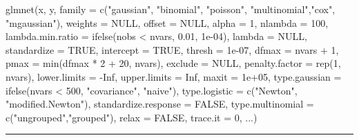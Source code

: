 \documentclass[
  letterpaper,
  DIV=11,
  numbers=noendperiod]{scrartcl}
\newenvironment{Shaded}{\begin{snugshade}}{\end{snugshade}}
\newcommand{\AttributeTok}[1]{\textcolor[rgb]{0.40,0.45,0.13}{#1}}
\newcommand{\ConstantTok}[1]{\textcolor[rgb]{0.56,0.35,0.01}{#1}}
\newcommand{\DecValTok}[1]{\textcolor[rgb]{0.68,0.00,0.00}{#1}}
\newcommand{\FloatTok}[1]{\textcolor[rgb]{0.68,0.00,0.00}{#1}}
\newcommand{\FunctionTok}[1]{\textcolor[rgb]{0.28,0.35,0.67}{#1}}
\newcommand{\NormalTok}[1]{\textcolor[rgb]{0.00,0.23,0.31}{#1}}
\newcommand{\SpecialCharTok}[1]{\textcolor[rgb]{0.37,0.37,0.37}{#1}}
\newcommand{\StringTok}[1]{\textcolor[rgb]{0.13,0.47,0.30}{#1}}
\begin{document}
\begin{Shaded}
\begin{Highlighting}[]
\FunctionTok{glmnet}\NormalTok{(x, y, }
 \AttributeTok{family =} \FunctionTok{c}\NormalTok{(}\StringTok{"gaussian"}\NormalTok{, }\StringTok{"binomial"}\NormalTok{, }\StringTok{"poisson"}\NormalTok{, }\StringTok{"multinomial"}\NormalTok{,}\StringTok{"cox"}\NormalTok{, }\StringTok{"mgaussian"}\NormalTok{),}
 \AttributeTok{weights =} \ConstantTok{NULL}\NormalTok{, }\AttributeTok{offset =} \ConstantTok{NULL}\NormalTok{, }\AttributeTok{alpha =} \DecValTok{1}\NormalTok{, }\AttributeTok{nlambda =} \DecValTok{100}\NormalTok{, }
 \AttributeTok{lambda.min.ratio =} \FunctionTok{ifelse}\NormalTok{(nobs }\SpecialCharTok{\textless{}}\NormalTok{ nvars, }\FloatTok{0.01}\NormalTok{, }\FloatTok{1e{-}04}\NormalTok{),}
 \AttributeTok{lambda =} \ConstantTok{NULL}\NormalTok{, }\AttributeTok{standardize =} \ConstantTok{TRUE}\NormalTok{, }\AttributeTok{intercept =} \ConstantTok{TRUE}\NormalTok{,}
 \AttributeTok{thresh =} \FloatTok{1e{-}07}\NormalTok{, }\AttributeTok{dfmax =}\NormalTok{ nvars }\SpecialCharTok{+} \DecValTok{1}\NormalTok{, }
 \AttributeTok{pmax =} \FunctionTok{min}\NormalTok{(dfmax }\SpecialCharTok{*} \DecValTok{2} \SpecialCharTok{+} \DecValTok{20}\NormalTok{, nvars), }
 \AttributeTok{exclude =} \ConstantTok{NULL}\NormalTok{, }\AttributeTok{penalty.factor =} \FunctionTok{rep}\NormalTok{(}\DecValTok{1}\NormalTok{, nvars),}
 \AttributeTok{lower.limits =} \SpecialCharTok{{-}}\ConstantTok{Inf}\NormalTok{, }\AttributeTok{upper.limits =} \ConstantTok{Inf}\NormalTok{, }\AttributeTok{maxit =} \FloatTok{1e+05}\NormalTok{,}
 \AttributeTok{type.gaussian =} \FunctionTok{ifelse}\NormalTok{(nvars }\SpecialCharTok{\textless{}} \DecValTok{500}\NormalTok{, }\StringTok{"covariance"}\NormalTok{, }\StringTok{"naive"}\NormalTok{),}
 \AttributeTok{type.logistic =} \FunctionTok{c}\NormalTok{(}\StringTok{"Newton"}\NormalTok{, }\StringTok{"modified.Newton"}\NormalTok{),}
 \AttributeTok{standardize.response =} \ConstantTok{FALSE}\NormalTok{, }
 \AttributeTok{type.multinomial =} \FunctionTok{c}\NormalTok{(}\StringTok{"ungrouped"}\NormalTok{,}\StringTok{"grouped"}\NormalTok{), }
 \AttributeTok{relax =} \ConstantTok{FALSE}\NormalTok{, }\AttributeTok{trace.it =} \DecValTok{0}\NormalTok{, ...)}
\end{Highlighting}
\end{Shaded}

\begin{center}\rule{0.5\linewidth}{0.5pt}\end{center}
\end{document}
